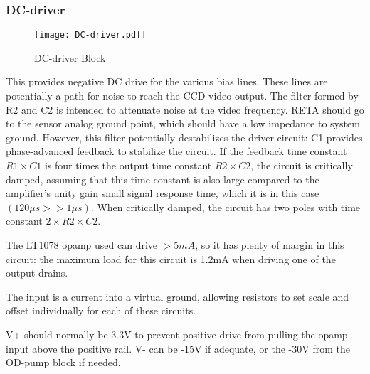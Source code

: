 \documentclass[a4paper,12pt]{article}
\begin{document}
%



\subsubsection{DC-driver}
   \begin{figure}
   \begin{center}
   \texttt{[image: DC-driver.pdf]}
   \end{center}
   \caption{DC-driver Block}
   \end{figure}

This provides negative DC drive for the various bias lines. These lines are potentially a path for noise to reach the CCD video output. The filter formed by R2 and C2 is intended to attenuate noise at the video frequency. RETA should go to the sensor analog ground point, which should have a low impedance to system ground.
However, this filter potentially destabilizes the driver circuit: C1 provides phase-advanced feedback to stabilize the circuit. If the feedback time constant $R1\times C1$ is four times the output time constant $R2\times C2$, the circuit is critically damped, assuming that this time constant is also large compared to the amplifier's unity gain small signal response time, which it is in this case $(120\mu s>>1 \mu s)$. When critically damped, the circuit has two poles with time constant $2\times R2\times C2$.

The LT1078 opamp used can drive $>5mA$, so it has plenty of margin in this circuit: the maximum load for this circuit is 1.2mA when driving one of the output drains. 

The input is a current into a virtual ground, allowing resistors to set scale and offset individually for each of these circuits.

V+ should normally be 3.3V to prevent positive drive from pulling the opamp input above the positive rail. V- can be -15V if adequate, or the -30V from the OD-pump block if needed.
\end{document}
